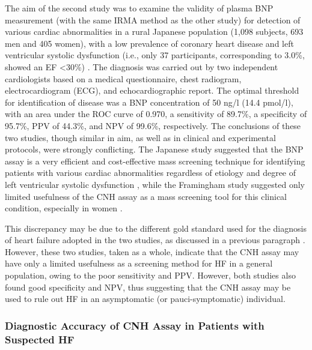 \documentclass[14pt,a4paper,onecolumn]{extarticle}
\begin{document}
The aim of the second study was to examine the validity of plasma BNP measurement
(with the same IRMA method as the other study) for detection of various cardiac abnormalities in a rural Japanese population (1,098 subjects, 693 men and 405 women), with
a low prevalence of coronary heart disease and left ventricular systolic dysfunction
(i.e., only 37 participants, corresponding to 3.0\%, showed an EF <30\%) \citep{bib366}. The diagnosis was carried out by two independent cardiologists based on a medical questionnaire, chest radiogram, electrocardiogram (ECG), and echocardiographic report. The optimal threshold for identification of disease was a BNP concentration of 50 ng/l (14.4
pmol/l), with an area under the ROC curve of 0.970, a sensitivity of 89.7\%, a specificity of 95.7\%, PPV of 44.3\%, and NPV of 99.6\%, respectively.
The conclusions of these two studies, though similar in aim, as well as in clinical and
experimental protocols, were strongly conflicting. The Japanese study suggested that the
BNP assay is a very efficient and cost-effective mass screening technique for identifying
patients with various cardiac abnormalities regardless of etiology and degree of left ventricular
systolic dysfunction \citep{bib366}, while the Framingham study suggested only limited usefulness of
the CNH assay as a mass screening tool for this clinical condition, especially in women \citep{bib39}.

This discrepancy may be due to the different gold standard used for the diagnosis of
heart failure adopted in the two studies, as discussed in a previous paragraph . However, these two studies, taken as a whole, indicate that the CNH assay may
have only a limited usefulness as a screening method for HF in a general population,
owing to the poor sensitivity and PPV. However, both studies also found good specificity
and NPV, thus suggesting that the CNH assay may be used to rule out HF in an asymptomatic (or pauci-symptomatic) individual.

\subsubsection{ Diagnostic Accuracy of CNH Assay in Patients with Suspected HF}
\end{document}
